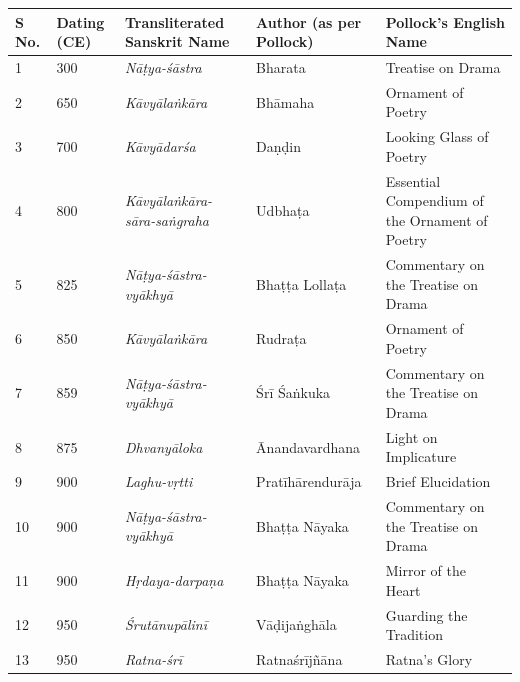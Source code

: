 \begin{longtable}{|l|p{1.1cm}|p{1.97cm}|p{1.98cm}|p{1.97cm}|}
\hline
S No. & Dating (CE) & Transliterated Sanskrit Name & Author (as per Pollock) & Pollock’s English Name \\
\hline
1 & 300 & \textit{Nāṭya-śāstra} & Bharata & Treatise on Drama \\
\hline
2 & 650 & \textit{Kāvyālaṅkāra}\index{Kavyalankara@\textit{Kāvyālaṅkāra}} & Bhāmaha\index{Bhamaha@Bhāmaha} & Ornament of Poetry \\
\hline
3 & 700 & \textit{Kāvyādarśa}\index{Kavyadarsa@\textit{Kāvyādarśa}} & Daṇḍin\index{Dandin@Daṇḍin} & Looking Glass of Poetry \\
\hline
4 & 800 & \textit{Kāvyālaṅkāra-sāra-saṅgraha}\index{Kavyalankarasarasangraha@\textit{Kāvyālaṅkārasāra-saṅgraha}} & Udbhaṭa\index{Udbhata@Udbhaṭa} & Essential Compendium of the Ornament of Poetry \\
\hline
5 & 825 & \textit{Nāṭya-śāstra-vyākhyā}\index{Natyasastravyakhya@\textit{Nāṭya-śāstra-vyākhyā}} & Bhaṭṭa Lollaṭa\index{Bhatta Lollata@Bhaṭṭa Lollaṭa} & Commentary on the Treatise on Drama \\
\hline
6 & 850 & \textit{Kāvyālaṅkāra} & Rudraṭa\index{Rudrata@Rudraṭa} & Ornament of Poetry \\
\hline
7 & 859 & \textit{Nāṭya-śāstra-vyākhyā}\index{Natyasastravyakhya@\textit{Nāṭya-śāstra-vyākhyā}} & Śrī Śaṅkuka\index{Sri Sankuka@Śrī Śaṅkuka} & Commentary on the Treatise on Drama \\
\hline
8 & 875 & \textit{Dhvanyāloka}\index{Dhvanyaloka@\textit{Dhvanyāloka}} & Ānandavar\-dhana\index{Anandavardhana@Ānandavardhana} & Light on Implicature \\
\hline
9 & 900 & \textit{Laghu-vṛtti}\index{Laghuvrtti@\textit{Laghu-vṛtti}} & Pratīhārendu\-rāja\index{Pratiharenduraja@Pratīhārendurāja} & Brief Elucidation \\
\hline
10 & 900 & \textit{Nāṭya-śāstra-vyākhyā}\index{Natyasastravyakhya@\textit{Nāṭya-śāstra-vyākhyā}} & Bhaṭṭa Nāyaka\index{Bhatta Nayaka@Bhaṭṭa Nāyaka} & Commentary on the Treatise on Drama \\
\hline
11 & 900 & \textit{Hṛdaya-darpaṇa}\index{Hrdayadarpana@\textit{Hṛdaya-darpaṇa}} & Bhaṭṭa Nāyaka & Mirror of the Heart \\
\hline
12 & 950 & \textit{Śrutānupālinī}\index{Srutanupalini@\textit{Śrutānupālinī}} & Vāḍijaṅghāla & Guarding the Tradition \\
\hline
13 & 950 & \textit{Ratna-śrī}\index{Ratnasri@\textit{Ratna-śrī}} & Ratnaśrījñāna\index{Ratnasrijnana@Ratnaśrījñāna} & Ratna’s Glory \\

\end{longtable}
